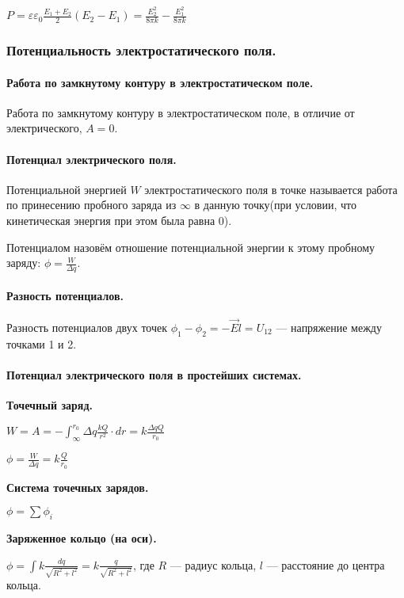 \documentclass{article}
\begin{document}
                \(P = \varepsilon\varepsilon_0 \frac{E_1 + E_2}{2}(E_2 - E_1) = \frac{E_2^2}{8\pi k} - \frac{E_1^2}{8\pi k}\)
        \subsubsection{Потенциальность электростатического поля.}
            \paragraph{Работа по замкнутому контуру в электростатическом поле.}
                Работа по замкнутому контуру в электростатическом поле, в отличие от электрического, \(A = 0\).
            \paragraph{Потенциал электрического поля.}
                Потенциальной энергией \(W\) электростатического поля в точке называется работа по принесению пробного заряда из \(\infty\) в данную точку(при условии, что кинетическая энергия при этом была равна \(0\)).

                Потенциалом назовём отношение потенциальной энергии к этому пробному заряду: \(\phi = \frac{W}{\Delta q}\).
            \paragraph{Разность потенциалов.}
                Разность потенциалов двух точек \(\phi_1 - \phi_2 = -\vec E l = U_{12}\) --- напряжение между точками 1 и 2.
            \paragraph{Потенциал электрического поля в простейших системах.}
                \textbf{Точечный заряд.}
                
                \(W = A = -\int_\infty^{r_0} \Delta q\frac{kQ}{r^2} \cdot dr = k\frac{\Delta q Q}{r_0}\)

                \(\phi = \frac{W}{\Delta q} = k\frac{Q}{r_0}\)

                \textbf{Система точечных зарядов.}
                
                \(\phi = \sum{\phi_i}\)

                \textbf{Заряженное кольцо (на оси).}

                \(\phi = \int k\frac{dq}{\sqrt{R^2 + l^2}} = k\frac{q}{\sqrt{R^2 + l^2}}\), где \(R\) --- радиус кольца, \(l\) --- расстояние до центра кольца.
\end{document}
